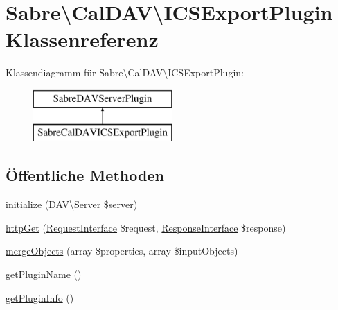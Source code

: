 \hypertarget{class_sabre_1_1_cal_d_a_v_1_1_i_c_s_export_plugin}{}\section{Sabre\textbackslash{}Cal\+D\+AV\textbackslash{}I\+C\+S\+Export\+Plugin Klassenreferenz}
\label{class_sabre_1_1_cal_d_a_v_1_1_i_c_s_export_plugin}
Klassendiagramm für Sabre\textbackslash{}Cal\+D\+AV\textbackslash{}I\+C\+S\+Export\+Plugin\+:\begin{figure}[H]
\begin{center}
\leavevmode
\includegraphics[height=2.000000cm]{class_sabre_1_1_cal_d_a_v_1_1_i_c_s_export_plugin}
\end{center}
\end{figure}
\subsection*{Öffentliche Methoden}
\begin{DoxyCompactItemize}
\item 
\mbox{\hyperlink{class_sabre_1_1_cal_d_a_v_1_1_i_c_s_export_plugin_a7f84805e3a7f0870901657de9a2a90a7}{initialize}} (\mbox{\hyperlink{class_sabre_1_1_d_a_v_1_1_server}{D\+A\+V\textbackslash{}\+Server}} \$server)
\item 
\mbox{\hyperlink{class_sabre_1_1_cal_d_a_v_1_1_i_c_s_export_plugin_aaea4a6e8e938f164a31b20639d10f025}{http\+Get}} (\mbox{\hyperlink{interface_sabre_1_1_h_t_t_p_1_1_request_interface}{Request\+Interface}} \$request, \mbox{\hyperlink{interface_sabre_1_1_h_t_t_p_1_1_response_interface}{Response\+Interface}} \$response)
\item 
\mbox{\hyperlink{class_sabre_1_1_cal_d_a_v_1_1_i_c_s_export_plugin_aba4823e517b1303be936f3f4e09f9410}{merge\+Objects}} (array \$properties, array \$input\+Objects)
\item 
\mbox{\hyperlink{class_sabre_1_1_cal_d_a_v_1_1_i_c_s_export_plugin_afd7ed0532a7cd549d8ab05e4d4ad18b6}{get\+Plugin\+Name}} ()
\item 
\mbox{\hyperlink{class_sabre_1_1_cal_d_a_v_1_1_i_c_s_export_plugin_aee7f1550a46bf9b118cf833764f71e83}{get\+Plugin\+Info}} ()
\end{DoxyCompactItemize}
